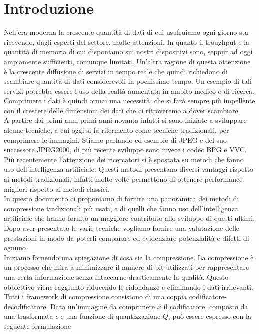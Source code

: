 \chapter*{Introduzione}
Nell’era moderna la crescente quantità di dati di cui usufruiamo ogni giorno sta ricevendo, dagli esperti del settore, molte attenzioni. In quanto il troughput e la quantità di memoria di cui disponiamo sui nostri dispositivi sono, seppur ad oggi ampiamente sufficienti, comunque limitati. Un’altra ragione di questa attenzione è la crescente diffusione di servizi in tempo reale che quindi richiedono di scambiare quantità di dati considerevoli in pochissimo tempo. Un esempio di tali servizi potrebbe essere l’uso della realtà aumentata in ambito medico o di ricerca. Comprimere i dati è quindi ormai una necessità, che si farà sempre più impellente con il crescere delle dimensioni dei dati che ci ritroveremo a dover scambiare.\\
A partire dai primi anni primi anni novanta infatti si sono iniziate a sviluppare alcune tecniche, a cui oggi si fa rifermento come tecniche tradizionali, per comprimere le immagini. Stiamo parlando ed esempio di JPEG e del suo successore JPEG2000, di più recente sviluppo sono invece i codec BPG e VVC.
Più recentemente l’attenzione dei ricercatori si è spostata su metodi che fanno uso dell'intelligenza artificiale. Questi metodi presentano diversi vantaggi rispetto ai metodi tradizionali, infatti molte volte permettono di ottenere performance migliori rispetto ai metodi classici.\\
In questo documento ci proponiamo di fornire una panoramica dei metodi di compressione tradizionali più usati, e di quelli che fanno uso dell'intelligenza artificiale che hanno fornito un maggiore contributo allo sviluppo di questi ultimi. Dopo aver presentato le varie tecniche vogliamo fornire una valutazione delle prestazioni in modo da poterli comparare ed evidenziare potenzialità e difetti di ognuno.\\
Iniziamo fornendo una spiegazione di cosa sia la compressione. La compressione è un processo che mira a minimizzare il numero di bit utilizzati per rappresentare una certa informazione senza intaccarne drasticamente la qualità. Questo obbiettivo viene raggiunto riducendo le ridondanze e eliminando i dati irrilevanti.
Tutti i framework di compressione consistono di una coppia codificatore-decodificatore. Data un’immagine da comprimere $x$ il codificatore, composto da una trasformata $\epsilon$ e una funzione di quantizzazione $Q$, può essere espresso con la seguente formulazione\\
